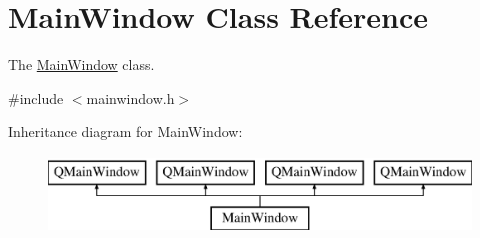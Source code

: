 \hypertarget{class_main_window}{}\section{Main\+Window Class Reference}
\label{class_main_window}


The \mbox{\hyperlink{class_main_window}{Main\+Window}} class.  




{\ttfamily \#include $<$mainwindow.\+h$>$}

Inheritance diagram for Main\+Window\+:\begin{figure}[H]
\begin{center}
\leavevmode
\includegraphics[height=2.000000cm]{class_main_window}
\end{center}
\end{figure}
